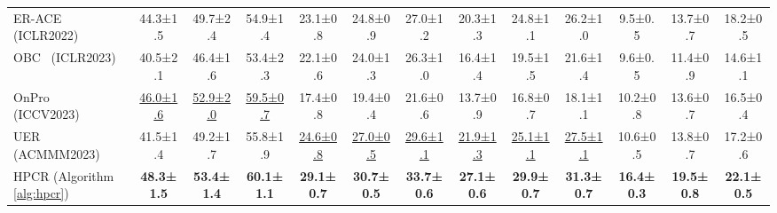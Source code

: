 \begin{table}[t]
\begin{tabular}{l|ccc|ccc|ccc|ccc}
ER-ACE~\cite{caccia2021new} (ICLR2022)   & 44.3\scriptsize±1.5 & 49.7\scriptsize±2.4                & 54.9\scriptsize±1.4                 & {23.1\scriptsize±0.8}                &{24.8\scriptsize±0.9}                  & {27.0\scriptsize±1.2} & {20.3\scriptsize±1.3}                   & {24.8\scriptsize±1.1}                  & {26.2\scriptsize±1.0} & 9.5\scriptsize±0.5                   & 13.7\scriptsize±0.7                  & 18.2\scriptsize±0.5\\
OBC~\cite{chrysakisonline} (ICLR2023)   & 40.5\scriptsize±2.1  & 46.4\scriptsize±1.6  & 53.4\scriptsize±2.3                 & 22.1\scriptsize±0.6  & 24.0\scriptsize±1.3  & 26.3\scriptsize±1.0 & 16.4\scriptsize±1.4  & 19.5\scriptsize±1.5  & 21.6\scriptsize±1.4 & 9.6\scriptsize±0.5                   & 11.4\scriptsize±0.9                  & 14.6\scriptsize±1.1\\
OnPro~\cite{wei2023online} (ICCV2023)   & \underline{46.0\scriptsize±1.6}  & \underline{52.9\scriptsize±2.0}  & \underline{59.5\scriptsize±0.7}                 & 17.4\scriptsize±0.8  & 19.4\scriptsize±0.4  & 21.6\scriptsize±0.6 & 13.7\scriptsize±0.9  & 16.8\scriptsize±0.7  & 18.1\scriptsize±1.1 & 10.2\scriptsize±0.8                   & 13.6\scriptsize±0.7                  & 16.5\scriptsize±0.4\\
UER~\cite{lin2023uer} (ACMMM2023)   & {41.5\scriptsize±1.4}& {49.2\scriptsize±1.7}                & {55.8\scriptsize±1.9}                 & \underline{24.6\scriptsize±0.8}                &\underline{27.0\scriptsize±0.5}                  & \underline{29.6\scriptsize±1.1} & \underline{21.9\scriptsize±1.3}                   & \underline{25.1\scriptsize±1.1}                  & \underline{27.5\scriptsize±1.1} & 10.6\scriptsize±0.5                   & 13.8\scriptsize±0.7                  & 17.2\scriptsize±0.6\\
\hline
HPCR (Algorithm \ref{alg:hpcr})   & \textbf{48.3\scriptsize±1.5}& \textbf{53.4\scriptsize±1.4}                & \textbf{60.1\scriptsize±1.1}                 & \textbf{29.1\scriptsize±0.7}                &\textbf{30.7\scriptsize±0.5}                 & \textbf{33.7\scriptsize±0.6} & \textbf{27.1\scriptsize±0.6}                   & \textbf{29.9\scriptsize±0.7}                  & \textbf{31.3\scriptsize±0.7} & \textbf{16.4\scriptsize±0.3}                   & \textbf{19.5\scriptsize±0.8}                  & \textbf{22.1\scriptsize±0.5}\\

\end{tabular}
\end{table}
